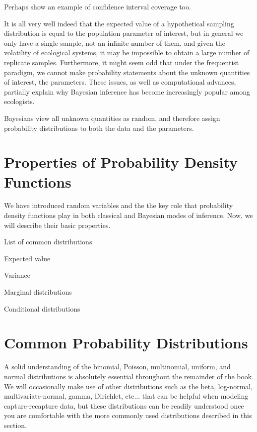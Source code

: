 Perhaps show an example of confidence interval coverage too.

It is all very well indeed that the expected value of a hypothetical
sampling distribution is equal to the population parameter of
interest, but in general we only have a single sample, not an infinite
number of them, and given the volatility of ecological
systems, it may be impossible to obtain a
large number of replicate samples. Furthermore, it might seem odd that
under the frequentist paradigm, we cannot make probability statements
about the unknown quantities of interest, the parameters. These
issues, as well as computational advances, partially explain why
Bayesian inference has become increasingly popular among ecologists.

Bayesians view all unknown quantities as random, and therefore assign
probability distributions to both the data and the parameters.



\section{Properties of Probability Density Functions}

We have introduced random variables and the the key role that
probability density functions
play in both classical and Bayesian modes of inference. Now, we will
describe their basic properties.

List of common distributions

Expected value

Variance

Marginal distributions

Conditional distributions


\section{Common Probability Distributions}
\label{sec.modeling.distributions}

A solid understanding of the binomial, Poisson, multinomial, uniform,
and normal distributions is absolutely essential throughout the
remainder of the book. We will occasionally make use of other
distributions such as the beta, log-normal, multivariate-normal,
gamma, Dirichlet, etc... that can be helpful when
modeling capture-recapture data, but these distributions can be
readily understood once you are comfortable with the more commonly
used distributions described in this section.

